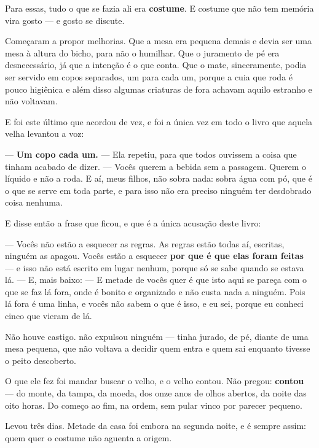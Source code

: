 \documentclass[livro.tex]{subfiles}
\begin{document}
Para essas, tudo o que se fazia ali era \textbf{costume}. E costume que não tem memória vira
gosto --- e gosto se discute.

\medskip

Começaram a propor melhorias. Que a mesa era pequena demais e devia ser uma mesa à altura do
bicho, para não o humilhar. Que o juramento de pé era desnecessário, já que a intenção é o que
conta. Que o mate, sinceramente, podia ser servido em copos separados, um para cada um, porque a
cuia que roda é pouco higiênica e além disso algumas criaturas de fora achavam aquilo estranho e
não voltavam.

E foi este último que acordou \Qui de vez, e foi a única vez em todo o livro que aquela velha
levantou a voz:

--- \textbf{Um copo cada um.} --- Ela repetiu, para que todos ouvissem a coisa que tinham
acabado de dizer. --- Vocês querem a bebida sem a passagem. Querem o líquido e não a roda. E aí,
meus filhos, não sobra nada: sobra água com pó, que é o que se serve em toda parte, e para isso
não era preciso ninguém ter desdobrado coisa nenhuma.

\medskip

E disse então a frase que ficou, e que é a única acusação deste livro:

--- Vocês não estão a esquecer as regras. As regras estão todas aí, escritas, ninguém as apagou.
Vocês estão a esquecer \textbf{por que é que elas foram feitas} --- e isso não está escrito em
lugar nenhum, porque só se sabe quando se estava lá. --- E, mais baixo: --- E metade de vocês
quer é que isto aqui se pareça com o que se faz lá fora, onde é bonito e organizado e não custa
nada a ninguém. Pois lá fora é uma linha, e vocês não sabem o que é isso, e eu sei, porque eu
conheci cinco que vieram de lá.

\medskip

Não houve castigo. \Ven não expulsou ninguém --- tinha jurado, de pé, diante de uma mesa
pequena, que não voltava a decidir quem entra e quem sai enquanto tivesse o peito descoberto.

O que ele fez foi mandar buscar o velho, e o velho contou. Não pregou: \textbf{contou} --- do
monte, da tampa, da moeda, dos onze anos de olhos abertos, da noite das oito horas. Do começo ao
fim, na ordem, sem pular vinco por parecer pequeno.

Levou três dias. Metade da casa foi embora na segunda noite, e é sempre assim: quem quer o
costume não aguenta a origem.
\end{document}
